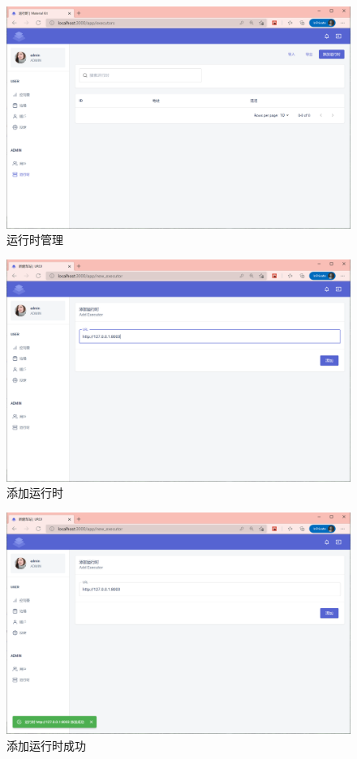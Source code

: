 \begin{figure}[htbp!]
    \centering
    \includegraphics[width=\textwidth]{figures/png/exes.png}
    \caption{\label{exes}运行时管理}
\end{figure}

\begin{figure}[htbp!]
    \centering
    \includegraphics[width=\textwidth]{figures/png/add_exes.png}
    \caption{\label{add_exes}添加运行时}
\end{figure}

\begin{figure}[htbp!]
    \centering
    \includegraphics[width=\textwidth]{figures/png/add_exe_succ.png}
    \caption{\label{add_exe_succ}添加运行时成功}
\end{figure}

